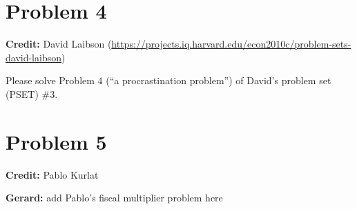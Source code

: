 \documentclass[11pt]{extarticle}
\theoremstyle{plain}
\theoremstyle{definition}
\begin{document}
\section*{Problem 4}

\textbf{Credit:} David Laibson (\url{https://projects.iq.harvard.edu/econ2010c/problem-sets-david-laibson})

Please solve Problem 4 (``a procrastination problem'') of David's problem set (PSET) \#3.





\vspace{10mm}
\section*{Problem 5}

\textbf{Credit:} Pablo Kurlat

\textbf{Gerard:} add Pablo's fiscal multiplier problem here
\end{document}
